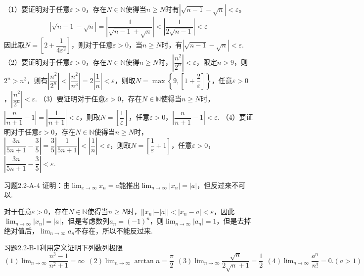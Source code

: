 \begin{solution}
    \noindent（1）要证明对于任意$\varepsilon>0$，存在$N\in\mathbb{N}$使得当$n\geq N$时有$|\sqrt{n-1}-\sqrt{n}|<\varepsilon$。
\[|\sqrt{n-1}-\sqrt{n}|=\left|\dfrac{1}{\sqrt{n-1}+\sqrt{n}}\right|<\left|\dfrac{1}{2\sqrt{n-1}}\right|<\varepsilon\]
因此取$N=\left[2+\dfrac{1}{4\varepsilon^2}\right]$，则对于任意$\varepsilon>0$，当$n\geq N$时，有$\left|\sqrt{n-1}-\sqrt{n}\right|<\varepsilon$.\newline
    （2）要证明对于任意$\varepsilon>0$，存在$N\in\mathbb{N}$使得$n\geq N$时，$\left|\dfrac{n^2}{2^n}\right|<\varepsilon$，限定$n>9$，则$2^n>n^3$，则有$\left|\dfrac{n^2}{2^n}\right|<\left|\dfrac{n^2}{n^3}\right|=2\left|\dfrac{1}{n}\right|<\varepsilon$，则取$N=\max\left\{9,\left[1+\dfrac{2}{\varepsilon}\right]\right\}$，任意$\varepsilon>0$，$\left|\dfrac{n^2}{2^n}\right|<\varepsilon$.\newline
    （3）要证明对于任意$\varepsilon>0$，存在$N\in\mathbb{N}$使得当$n\geq N$时，$\left|\dfrac{n}{n+1}-1\right|=\left|\dfrac{1}{n+1}\right|<\varepsilon$，则取$N=\left[\dfrac{1}{\varepsilon}\right]$，任意$\varepsilon>0$，$\left|\dfrac{n}{n+1}-1\right|<\varepsilon$.\newline
    （4）要证明对于任意$\varepsilon>0$，存在$N\in\mathbb{N}$使得当$n\geq N$时，$\left|\dfrac{3n}{5n+1}-\dfrac{3}{5}\right|=\dfrac{3}{5}\left|\dfrac{1}{5n+1}\right|<\left|\dfrac{1}{n}\right|<\varepsilon$，则取$N=\left[\dfrac{1}{\varepsilon}+1\right]$，任意$\varepsilon>0$，$\left|\dfrac{3n}{5n+1}-\dfrac{3}{5}\right|<\varepsilon$.\newline
\end{solution}
\begin{example}{习题2.2-A-4}{}
    证明：由$\displaystyle\lim_{x\to\infty}x_n=a$能推出$\displaystyle\lim_{n\to\infty}|x_n|=|a|$，但反过来不可以.
\end{example}
\begin{solution}
    对于任意$\varepsilon>0$，存在$N\in\mathbb{N}$使得当$n\geq N$时，$||x_n|-|a||<|x_n-a|<\varepsilon$，因此$\displaystyle\lim_{n\to\infty}|x_n|=|a|$，但是考虑数列$a_n=(-1)^n$，则$\displaystyle\lim_{n\to\infty}|a_n|=1$，但是去掉绝对值后，$\displaystyle\lim_{n\to\infty}a_n$不存在，所以不能反过来.
\end{solution}
\begin{example}{习题2.2-B-1}{利用定义证明下列数列极限}
$(1)\displaystyle \lim_{n\to\infty}\dfrac{n^3-1}{n^2+1}=\infty~~(2)\lim_{n\to\infty}\arctan n=\dfrac{\pi}2~~(3)\displaystyle \lim_{n\to\infty}\dfrac{\sqrt{n}}{2\sqrt{n}+1}=\dfrac12~~(4)\lim_{n\to\infty}\dfrac{a^n}{n!}=0.(a>1)$
\end{example}
